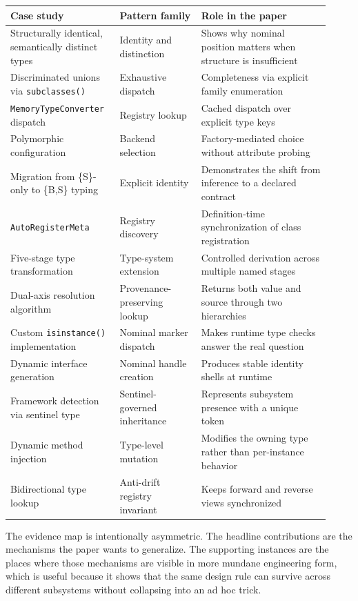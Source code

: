 \begin{center}
\begin{tabular}{@{}p{0.30\linewidth}p{0.24\linewidth}p{0.38\linewidth}@{}}
\toprule
\textbf{Case study} & \textbf{Pattern family} & \textbf{Role in the paper} \\
\midrule
Structurally identical, semantically distinct types & Identity and distinction & Shows why nominal position matters when structure is insufficient \\
Discriminated unions via \texttt{subclasses()} & Exhaustive dispatch & Completeness via explicit family enumeration \\
\texttt{MemoryTypeConverter} dispatch & Registry lookup & Cached dispatch over explicit type keys \\
Polymorphic configuration & Backend selection & Factory-mediated choice without attribute probing \\
Migration from \{S\}-only to \{B,S\} typing & Explicit identity & Demonstrates the shift from inference to a declared contract \\
\texttt{AutoRegisterMeta} & Registry discovery & Definition-time synchronization of class registration \\
Five-stage type transformation & Type-system extension & Controlled derivation across multiple named stages \\
Dual-axis resolution algorithm & Provenance-preserving lookup & Returns both value and source through two hierarchies \\
Custom \texttt{isinstance()} implementation & Nominal marker dispatch & Makes runtime type checks answer the real question \\
Dynamic interface generation & Nominal handle creation & Produces stable identity shells at runtime \\
Framework detection via sentinel type & Sentinel-governed inheritance & Represents subsystem presence with a unique token \\
Dynamic method injection & Type-level mutation & Modifies the owning type rather than per-instance behavior \\
Bidirectional type lookup & Anti-drift registry invariant & Keeps forward and reverse views synchronized \\
\bottomrule
\end{tabular}
\end{center}

The evidence map is intentionally asymmetric. The headline contributions are the mechanisms the paper wants to generalize. The supporting instances are the places where those mechanisms are visible in more mundane engineering form, which is useful because it shows that the same design rule can survive across different subsystems without collapsing into an ad hoc trick.

